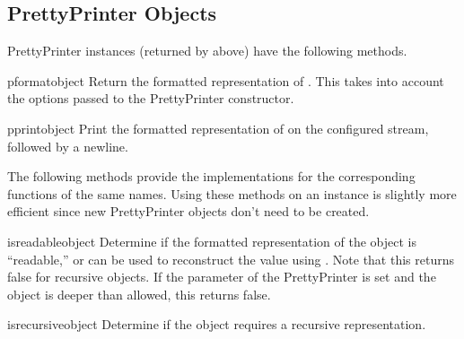 \subsection{PrettyPrinter Objects}

PrettyPrinter instances (returned by  above)
have the following methods.

\renewcommand{\indexsubitem}{(PrettyPrinter method)}

\begin{funcdesc}{pformat}{object}
Return the formatted representation of .  This takes into
account the options passed to the PrettyPrinter constructor.
\end{funcdesc}

\begin{funcdesc}{pprint}{object}
Print the formatted representation of  on the configured
stream, followed by a newline.
\end{funcdesc}

The following methods provide the implementations for the
corresponding functions of the same names.  Using these methods on an
instance is slightly more efficient since new PrettyPrinter objects
don't need to be created.

\begin{funcdesc}{isreadable}{object}
Determine if the formatted representation of the object is
``readable,'' or can be used to reconstruct the value using
.  Note that this returns false for recursive objects.
If the  parameter of the PrettyPrinter is set and the
object is deeper than allowed, this returns false.
\end{funcdesc}

\begin{funcdesc}{isrecursive}{object}
Determine if the object requires a recursive representation.
\end{funcdesc}
